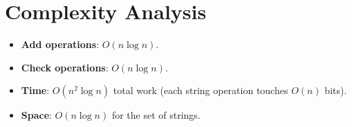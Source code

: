 \documentclass[11pt,a4paper]{article}
\begin{document}
\section{Complexity Analysis}

\begin{itemize}
  \item \textbf{Add operations}: $O(n \log n)$.
  \item \textbf{Check operations}: $O(n \log n)$.
  \item \textbf{Time}: $O(n^2 \log n)$ total work (each string operation touches $O(n)$ bits).
  \item \textbf{Space}: $O(n \log n)$ for the set of strings.
\end{itemize}
\end{document}
